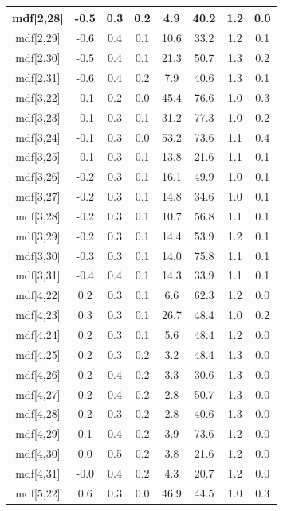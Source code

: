 \begin{longtable}{|c|c|c|c|c|c|c|c|}
\hline
mdf[2,28] & -0.5 & 0.3 & 0.2 & 4.9 & 40.2 & 1.2 & 0.0 \\
\hline
mdf[2,29] & -0.6 & 0.4 & 0.1 & 10.6 & 33.2 & 1.2 & 0.1 \\
\hline
mdf[2,30] & -0.5 & 0.4 & 0.1 & 21.3 & 50.7 & 1.3 & 0.2 \\
\hline
mdf[2,31] & -0.6 & 0.4 & 0.2 & 7.9 & 40.6 & 1.3 & 0.1 \\
\hline
mdf[3,22] & -0.1 & 0.2 & 0.0 & 45.4 & 76.6 & 1.0 & 0.3 \\
\hline
mdf[3,23] & -0.1 & 0.3 & 0.1 & 31.2 & 77.3 & 1.0 & 0.2 \\
\hline
mdf[3,24] & -0.1 & 0.3 & 0.0 & 53.2 & 73.6 & 1.1 & 0.4 \\
\hline
mdf[3,25] & -0.1 & 0.3 & 0.1 & 13.8 & 21.6 & 1.1 & 0.1 \\
\hline
mdf[3,26] & -0.2 & 0.3 & 0.1 & 16.1 & 49.9 & 1.0 & 0.1 \\
\hline
mdf[3,27] & -0.2 & 0.3 & 0.1 & 14.8 & 34.6 & 1.0 & 0.1 \\
\hline
mdf[3,28] & -0.2 & 0.3 & 0.1 & 10.7 & 56.8 & 1.1 & 0.1 \\
\hline
mdf[3,29] & -0.2 & 0.3 & 0.1 & 14.4 & 53.9 & 1.2 & 0.1 \\
\hline
mdf[3,30] & -0.3 & 0.3 & 0.1 & 14.0 & 75.8 & 1.1 & 0.1 \\
\hline
mdf[3,31] & -0.4 & 0.4 & 0.1 & 14.3 & 33.9 & 1.1 & 0.1 \\
\hline
mdf[4,22] & 0.2 & 0.3 & 0.1 & 6.6 & 62.3 & 1.2 & 0.0 \\
\hline
mdf[4,23] & 0.3 & 0.3 & 0.1 & 26.7 & 48.4 & 1.0 & 0.2 \\
\hline
mdf[4,24] & 0.2 & 0.3 & 0.1 & 5.6 & 48.4 & 1.2 & 0.0 \\
\hline
mdf[4,25] & 0.2 & 0.3 & 0.2 & 3.2 & 48.4 & 1.3 & 0.0 \\
\hline
mdf[4,26] & 0.2 & 0.4 & 0.2 & 3.3 & 30.6 & 1.3 & 0.0 \\
\hline
mdf[4,27] & 0.2 & 0.4 & 0.2 & 2.8 & 50.7 & 1.3 & 0.0 \\
\hline
mdf[4,28] & 0.2 & 0.3 & 0.2 & 2.8 & 40.6 & 1.3 & 0.0 \\
\hline
mdf[4,29] & 0.1 & 0.4 & 0.2 & 3.9 & 73.6 & 1.2 & 0.0 \\
\hline
mdf[4,30] & 0.0 & 0.5 & 0.2 & 3.8 & 21.6 & 1.2 & 0.0 \\
\hline
mdf[4,31] & -0.0 & 0.4 & 0.2 & 4.3 & 20.7 & 1.2 & 0.0 \\
\hline
mdf[5,22] & 0.6 & 0.3 & 0.0 & 46.9 & 44.5 & 1.0 & 0.3 \\

\end{longtable}
